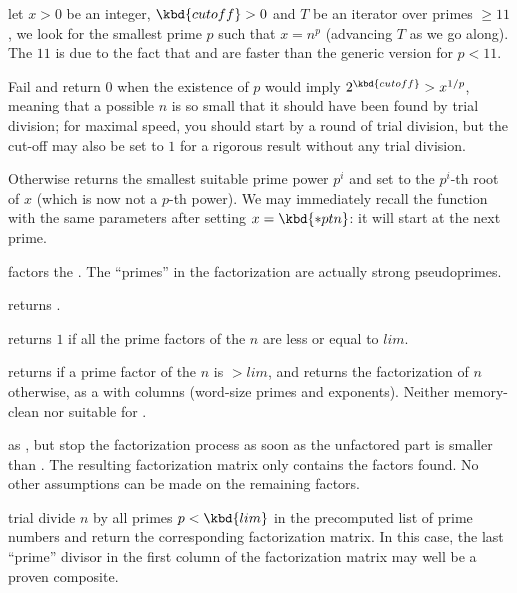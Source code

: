 let $x > 0$ be an integer, $\kbd{cutoff} > 0$ and $T$ be an iterator over
primes $\geq 11$, we look for the smallest prime $p$ such that $x = n^p$
(advancing $T$ as we go along). The $11$ is due to the fact that
 and  are faster than the generic version for
$p < 11$.

Fail and return $0$ when the existence of $p$ would imply $2^{\kbd{cutoff}} >
x^{1/p}$, meaning that a possible $n$ is so small that it should have been
found by trial division; for maximal speed, you should start by a round of
trial division, but the cut-off may also be set to $1$ for a rigorous result
without any trial division.

Otherwise returns the smallest suitable prime power $p^i$ and set 
to the $p^i$-th root of $x$ (which is now not a $p$-th power). We may
immediately recall the function with the same parameters after setting $x =
\kbd{*ptn}$: it will start at the next prime.


 factors the  . The ``primes''
in the factorization are actually strong pseudoprimes.

 returns .

 returns $1$ if all the
prime factors of the  $n$ are less or equal to $lim$.

 returns  if a prime
factor of the  $n$ is $> lim$, and returns the factorization
of $n$ otherwise, as a  with  columns (word-size
primes and exponents). Neither memory-clean nor suitable for
.

 as , but stop the
factorization process as soon as the unfactored part is smaller than .
The resulting factorization matrix only contains the factors found. No other
assumptions can be made on the remaining factors.

 trial divide $n$ by all primes $p
< \kbd{lim}$ in the precomputed list of prime numbers and return the
corresponding factorization matrix. In this case, the last ``prime'' divisor
in the first column of the factorization matrix may well be a proven
composite.

